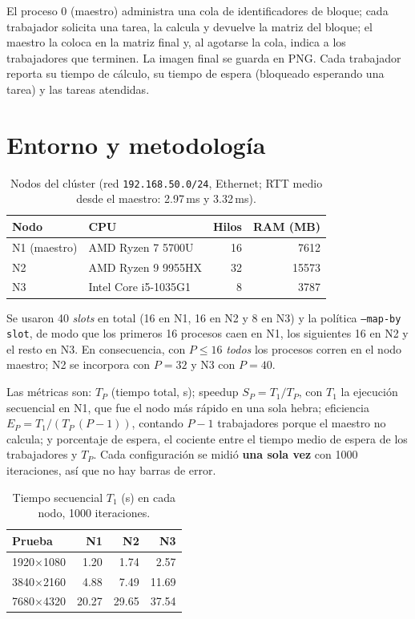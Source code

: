 \documentclass[runningheads]{llncs}
\begin{document}
El proceso 0 (maestro) administra una cola de identificadores de bloque; cada trabajador solicita una tarea, la
calcula y devuelve la matriz del bloque; el maestro la coloca en la matriz final y, al agotarse la cola, indica a los
trabajadores que terminen. La imagen final se guarda en PNG. Cada trabajador reporta su tiempo de c\'alculo, su tiempo
de espera (bloqueado esperando una tarea) y las tareas atendidas.

\section{Entorno y metodolog\'ia}
\begin{table}[t]
\caption{Nodos del cl\'uster (red \texttt{192.168.50.0/24}, Ethernet; RTT medio desde el maestro: 2.97\,ms y 3.32\,ms).}
\centering\footnotesize
\begin{tabular}{|l|l|r|r|}\hline
Nodo & CPU & Hilos & RAM (MB)\\ \hline
N1 (maestro) & AMD Ryzen 7 5700U & 16 & 7612 \\ \hline
N2 & AMD Ryzen 9 9955HX & 32 & 15573 \\ \hline
N3 & Intel Core i5-1035G1 & 8 & 3787 \\ \hline
\end{tabular}
\end{table}
Se usaron 40 \emph{slots} en total (16 en N1, 16 en N2 y 8 en N3) y la pol\'itica \texttt{--map-by slot}, de modo que los
primeros 16 procesos caen en N1, los siguientes 16 en N2 y el resto en N3. En consecuencia, con $P\le16$ \emph{todos}
los procesos corren en el nodo maestro; N2 se incorpora con $P=32$ y N3 con $P=40$.

Las m\'etricas son: $T_P$ (tiempo total, s); speedup $S_P=T_1/T_P$, con $T_1$ la ejecuci\'on secuencial en N1, que fue el
nodo m\'as r\'apido en una sola hebra; eficiencia $E_P=T_1/(T_P\,(P-1))$, contando $P-1$ trabajadores porque el maestro
no calcula; y porcentaje de espera, el cociente entre el tiempo medio de espera de los trabajadores y $T_P$.
Cada configuraci\'on se midi\'o \textbf{una sola vez} con 1000 iteraciones, as\'i que no hay barras de error.
\begin{table}[t]
\caption{Tiempo secuencial $T_1$ (s) en cada nodo, 1000 iteraciones.}
\centering\footnotesize
\begin{tabular}{|l|r|r|r|}\hline
Prueba & N1 & N2 & N3 \\ \hline
1920$\times$1080 & 1.20 & 1.74 & 2.57 \\ \hline
3840$\times$2160 & 4.88 & 7.49 & 11.69 \\ \hline
7680$\times$4320 & 20.27 & 29.65 & 37.54 \\ \hline
\end{tabular}
\end{table}
\end{document}
